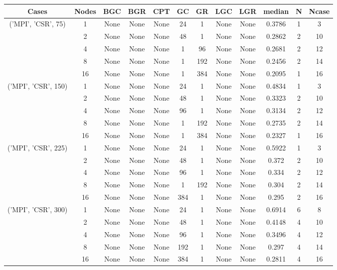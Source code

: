 \begin{tabular}{cccccccccccc}
\hline
Cases & Nodes& BGC& BGR& CPT& GC& GR& LGC& LGR& median & N & Ncase \\
\hline
\multirow{5}{*}{('MPI', 'CSR', 75)}& 1& None& None& None& 24& 1& None& None& 0.3786& 1& 3\\
& 2& None& None& None& 48& 1& None& None& 0.2862& 2& 10\\
& 4& None& None& None& 1& 96& None& None& 0.2681& 2& 12\\
& 8& None& None& None& 1& 192& None& None& 0.2456& 2& 14\\
& 16& None& None& None& 1& 384& None& None& 0.2095& 1& 16\\
\hline
\multirow{5}{*}{('MPI', 'CSR', 150)}& 1& None& None& None& 24& 1& None& None& 0.4834& 1& 3\\
& 2& None& None& None& 48& 1& None& None& 0.3323& 2& 10\\
& 4& None& None& None& 96& 1& None& None& 0.3134& 2& 12\\
& 8& None& None& None& 1& 192& None& None& 0.2735& 2& 14\\
& 16& None& None& None& 1& 384& None& None& 0.2327& 1& 16\\
\hline
\multirow{5}{*}{('MPI', 'CSR', 225)}& 1& None& None& None& 24& 1& None& None& 0.5922& 1& 3\\
& 2& None& None& None& 48& 1& None& None& 0.372& 2& 10\\
& 4& None& None& None& 96& 1& None& None& 0.334& 2& 12\\
& 8& None& None& None& 1& 192& None& None& 0.304& 2& 14\\
& 16& None& None& None& 384& 1& None& None& 0.295& 2& 16\\
\hline
\multirow{5}{*}{('MPI', 'CSR', 300)}& 1& None& None& None& 24& 1& None& None& 0.6914& 6& 8\\
& 2& None& None& None& 48& 1& None& None& 0.4148& 4& 10\\
& 4& None& None& None& 96& 1& None& None& 0.3496& 4& 12\\
& 8& None& None& None& 192& 1& None& None& 0.297& 4& 14\\
& 16& None& None& None& 384& 1& None& None& 0.2811& 4& 16\\
\hline
\end{tabular}
